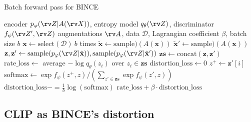 \documentclass[final]{article}
\begin{document}
\begin{algorithm}[t]
\caption{Batch forward pass for BINCE}
\label{alg:BINCE_batch}
    \begin{algorithmic}[1]
    \Require encoder $p_{\varphi}(\rv Z | A(\rv X))$,  entropy model $q_{\theta}(\rv Z)$, discriminator $f_{\psi}(\rv Z', \rv Z)$
    \Require augmentations $\rv A$, data $\mathcal{D}$, Lagrangian coefficient $\beta$, batch size $b$ 
    \State $\mathbf{x} \leftarrow  \mathrm{select}(\mathcal{D})\ b$ times   
    \State $\tilde{\mathbf{x}} \leftarrow \text{sample})(A(\mathbf{x}))$ 
    \State $\tilde{\mathbf{x}}' \leftarrow \text{sample})(A(\mathbf{x}))$ 
    \State $\mathbf{z},\mathbf{z}' \leftarrow \mathrm{sample}(p_{\varphi}(\rv Z | \tilde{\mathbf{x}}  )), \mathrm{sample}(p_{\varphi}(\rv Z | \tilde{\mathbf{x}}'  ))$ 
    \State $\mathbf{zs} \leftarrow \mathrm{concat}(\mathbf{z},\mathbf{z}') $
    \State $\mathrm{rate\_loss}  \leftarrow$ average $ - \log q_{\theta}(z_i)$ over $z_i \in \mathbf{zs}$ 
    \State $\mathrm{distortion\_loss}  \leftarrow 0$
    \State $z^+ \leftarrow \mathbf{z}'[i]$  
    \State $\mathrm{softmax} \leftarrow \exp f_\psi( z^{+}, z) / (\sum_{z' \in \mathbf{zs}} \exp f_\psi( z',  z))$  
    \State $\mathrm{distortion\_loss}  \mathrel{{-}{=}} \frac{1}{b}  \log (\mathrm{softmax}) $  
    \EndFor{}
    \Return $\mathrm{rate\_loss} + \beta \cdot \mathrm{distortion\_loss}$
\end{algorithmic}
\end{algorithm} 

\subsection{CLIP as BINCE's distortion}
\label{appx:clip_bince}
\end{document}
